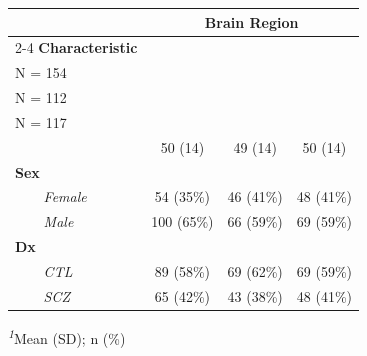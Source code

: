 \begin{table}[t]
\fontsize{12.0pt}{14.0pt}\selectfont
\begin{tabular*}{\linewidth}{@{\extracolsep{\fill}}lccc}
\toprule
 & \multicolumn{3}{c}{\textbf{Brain Region}} \\ 
\cmidrule(lr){2-4}
\textbf{Characteristic} & \shortstack[l]{\textbf{Caudate} \\N = 154}\textsuperscript{\textit{1}} & \shortstack[l]{\textbf{DLPFC} \\N = 112}\textsuperscript{\textit{1}} & \shortstack[l]{\textbf{Hippocampus} \\N = 117}\textsuperscript{\textit{1}} \\ 
\midrule\addlinespace[2.5pt]
{\bfseries Age} & 50 (14) & 49 (14) & 50 (14) \\ 
{\bfseries Sex} &  &  &  \\ 
{\itshape     Female} & 54 (35\%) & 46 (41\%) & 48 (41\%) \\ 
{\itshape     Male} & 100 (65\%) & 66 (59\%) & 69 (59\%) \\ 
{\bfseries Dx} &  &  &  \\ 
{\itshape     CTL} & 89 (58\%) & 69 (62\%) & 69 (59\%) \\ 
{\itshape     SCZ} & 65 (42\%) & 43 (38\%) & 48 (41\%) \\ 
\bottomrule
\end{tabular*}
\begin{minipage}{\linewidth}
\textsuperscript{\textit{1}}Mean (SD); n (\%)\\
\end{minipage}
\end{table}

